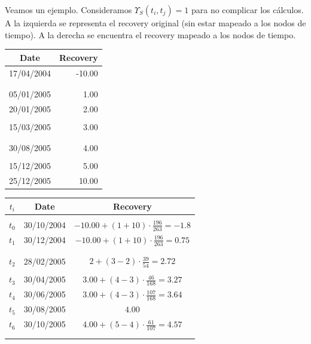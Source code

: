Veamos un ejemplo. Consideramos $\Upsilon_S(t_i,t_j)=1$ para no complicar los c\'alculos.
A la izquierda se representa el recovery original (sin estar mapeado a los nodos de
tiempo). A la derecha se encuentra el recovery mapeado a los nodos de tiempo.
\newline
\newline
\begin{minipage}[c]{0.4\columnwidth}%
\centering
\begin{tabular}{c|r}
\textbf{Date} & \textbf{Recovery} \\
\hline
17/04/2004 & -10.00 \\
           &        \\
           &        \\
05/01/2005 &   1.00 \\
20/01/2005 &   2.00 \\
           &        \\
15/03/2005 &   3.00 \\
           &        \\
           &        \\
30/08/2005 &   4.00 \\
           &        \\
15/12/2005 &   5.00 \\
25/12/2005 &  10.00 \\
\end{tabular}
\end{minipage}%
\begin{minipage}[c]{0.6\columnwidth}%
\centering
\begin{tabular}{c|c|c}
\textbf{$t_i$} & \textbf{Date}  & \textbf{Recovery} \\
\hline
      &            &      \\
$t_0$ & 30/10/2004 & $-10.00 + (1+10) \cdot \frac{196}{263} =  -1.8$\\
$t_1$ & 30/12/2004 & $-10.00 + (1+10) \cdot \frac{196}{263} =  0.75$ \\
      &            &      \\
      &            &      \\
$t_2$ & 28/02/2005 & $2 + (3-2) \cdot \frac{39}{54} = 2.72$ \\
      &            &      \\
$t_3$ & 30/04/2005 & $3.00 + (4-3) \cdot \frac{46}{168} = 3.27$ \\
$t_4$ & 30/06/2005 & $3.00 + (4-3) \cdot \frac{107}{168} = 3.64$ \\
$t_5$ & 30/08/2005 & $4.00$ \\
$t_6$ & 30/10/2005 & $4.00 + (5-4) \cdot \frac{61}{107} = 4.57$ \\
      &            &      \\
      &            &      \\
\end{tabular}
\end{minipage}%

